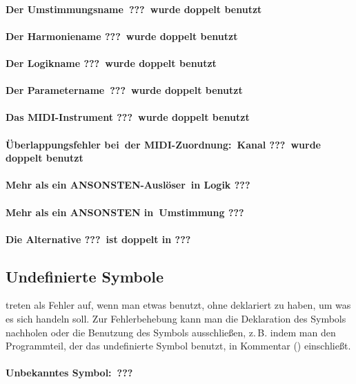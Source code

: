 \paragraph{Der Umstimmungsname\ ???\ wurde doppelt benutzt}
\paragraph{Der Harmoniename ???\ wurde doppelt benutzt}
\paragraph{Der Logikname ???\ wurde doppelt benutzt}
\paragraph{Der Parametername\ ???\ wurde doppelt benutzt}
\paragraph{Das MIDI-Instrument ???\ wurde doppelt benutzt}
\paragraph{Überlappungsfehler bei\ der MIDI-Zuordnung:\ Kanal ???\ wurde doppelt benutzt}
\paragraph{Mehr als ein ANSONSTEN-Auslöser\ in Logik ???}
\paragraph{Mehr als ein ANSONSTEN in\ Umstimmung ???}
\paragraph{Die Alternative ???\ ist doppelt in ???}

\subsection{Undefinierte Symbole}\label{sec:undefinierte-symbole}
treten als Fehler auf, wenn man etwas benutzt, ohne deklariert 
zu haben, um was es sich handeln soll. Zur Fehlerbehebung
kann man die Deklaration des Symbols nachholen oder die
Benutzung des Symbols ausschließen, z.\,B. indem man
den Programmteil, der das undefinierte Symbol benutzt,
in Kommentar (\dq) einschließt.
\paragraph{Unbekanntes Symbol:\ ???}
